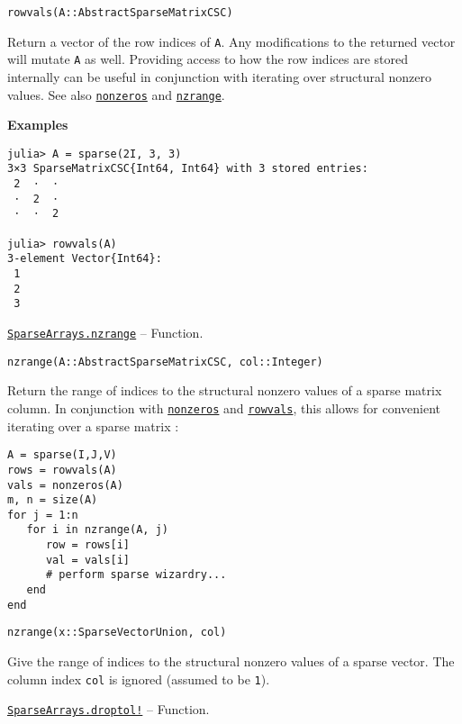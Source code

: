 \begin{adjustwidth}{2em}{0pt}


\begin{verbatim}
rowvals(A::AbstractSparseMatrixCSC)
\end{verbatim}

Return a vector of the row indices of \texttt{A}. Any modifications to the returned vector will mutate \texttt{A} as well. Providing access to how the row indices are stored internally can be useful in conjunction with iterating over structural nonzero values. See also \hyperlink{2553509978651134823}{\texttt{nonzeros}} and \hyperlink{4192027552568489301}{\texttt{nzrange}}.

\textbf{Examples}


\begin{verbatim}
julia> A = sparse(2I, 3, 3)
3×3 SparseMatrixCSC{Int64, Int64} with 3 stored entries:
 2  ⋅  ⋅
 ⋅  2  ⋅
 ⋅  ⋅  2

julia> rowvals(A)
3-element Vector{Int64}:
 1
 2
 3
\end{verbatim}



\end{adjustwidth}
\hypertarget{4192027552568489301}{}
\hyperlink{4192027552568489301}{\texttt{SparseArrays.nzrange}}  -- {Function.}

\begin{adjustwidth}{2em}{0pt}


\begin{verbatim}
nzrange(A::AbstractSparseMatrixCSC, col::Integer)
\end{verbatim}

Return the range of indices to the structural nonzero values of a sparse matrix column. In conjunction with \hyperlink{2553509978651134823}{\texttt{nonzeros}} and \hyperlink{11529930160190690800}{\texttt{rowvals}}, this allows for convenient iterating over a sparse matrix :


\begin{lstlisting}
A = sparse(I,J,V)
rows = rowvals(A)
vals = nonzeros(A)
m, n = size(A)
for j = 1:n
   for i in nzrange(A, j)
      row = rows[i]
      val = vals[i]
      # perform sparse wizardry...
   end
end
\end{lstlisting}




\begin{lstlisting}
nzrange(x::SparseVectorUnion, col)
\end{lstlisting}

Give the range of indices to the structural nonzero values of a sparse vector. The column index \texttt{col} is ignored (assumed to be \texttt{1}).



\end{adjustwidth}
\hypertarget{10473482629417875992}{}
\hyperlink{10473482629417875992}{\texttt{SparseArrays.droptol!}}  -- {Function.}

